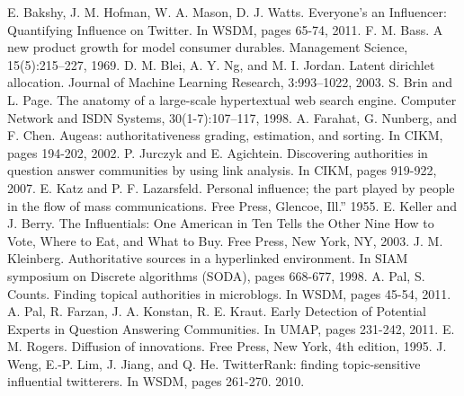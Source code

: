 \clearpage
{}

\begin{thebibliography}{99}
    	{E. Bakshy, J. M. Hofman, W. A. Mason, D. J. Watts. Everyone’s an Influencer: Quantifying Influence on Twitter. In WSDM, pages 65-74, 2011.}
    	{F. M. Bass. A new product growth for model consumer
durables. Management Science, 15(5):215–227, 1969.}
    	{D. M. Blei, A. Y. Ng, and M. I. Jordan. Latent dirichlet allocation. Journal of Machine Learning Research, 3:993–1022, 2003.}
    	{S. Brin and L. Page. The anatomy of a large-scale hypertextual web search engine. Computer Network and ISDN Systems, 30(1-7):107–117, 1998.}
    	{A. Farahat, G. Nunberg, and F. Chen. Augeas: authoritativeness grading, estimation, and sorting. In CIKM, pages 194-202, 2002.}
    	{P. Jurczyk and E. Agichtein. Discovering authorities in question answer communities by using link analysis. In CIKM, pages 919-922, 2007.}
    	{E. Katz and P. F. Lazarsfeld. Personal influence; the part played by people in the flow of mass communications. Free Press, Glencoe, Ill.” 1955.}
    	{E. Keller and J. Berry. The Influentials: One American in Ten Tells the Other Nine How to Vote, Where to Eat, and What to Buy. Free Press, New York, NY, 2003.}
    	{J. M. Kleinberg. Authoritative sources in a hyperlinked environment. In SIAM symposium on Discrete algorithms (SODA), pages 668-677, 1998.}
    	{A. Pal, S. Counts. Finding topical authorities in microblogs. In WSDM, pages 45-54, 2011.}
    	{A. Pal, R. Farzan, J. A. Konstan, R. E. Kraut. Early Detection of Potential Experts in Question Answering Communities. In UMAP, pages 231-242, 2011.}
    	{E. M. Rogers. Diffusion of innovations. Free Press, New York, 4th edition, 1995.}
    	{J. Weng, E.-P. Lim, J. Jiang, and Q. He. TwitterRank: finding topic-sensitive influential twitterers. In WSDM, pages 261-270. 2010.}
\end{thebibliography}
